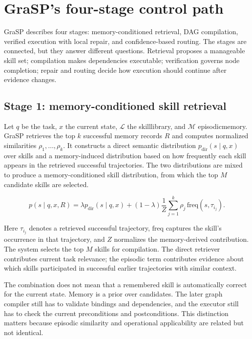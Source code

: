 \section{GraSP's four-stage control path}
\label{sec:ch17-four-stage}

GraSP describes four stages: memory-conditioned retrieval, DAG compilation, verified execution with local repair, and confidence-based routing. The stages are connected, but they answer different questions. Retrieval proposes a manageable skill set; compilation makes dependencies executable; verification governs node completion; repair and routing decide how execution should continue after evidence changes.\autocite{xia2026grasp}

\subsection{Stage 1: memory-conditioned skill retrieval}

Let \(q\) be the task, \(x\) the current state, \(\mathcal{L}\) the \gls{skilllibrary}, and \(\mathcal{M}\) \gls{episodicmemory}. GraSP retrieves the top \(k\) successful memory records \(R\) and computes normalized similarities \(\rho_1,\ldots,\rho_k\). It constructs a direct semantic distribution \(p_{\mathrm{dir}}(s\mid q,x)\) over skills and a memory-induced distribution based on how frequently each skill appears in the retrieved successful trajectories. The two distributions are mixed to produce a memory-conditioned skill distribution, from which the top \(M\) candidate skills are selected.

\[
 p(s\mid q,x,R)=\lambda p_{\mathrm{dir}}(s\mid q,x)
 +(1-\lambda)\frac{1}{Z}\sum_{j=1}^{k}\rho_j\,\mathrm{freq}(s,\tau_{i_j}).
\]

Here \(\tau_{i_j}\) denotes a retrieved successful trajectory, \(\mathrm{freq}\) captures the skill's occurrence in that trajectory, and \(Z\) normalizes the memory-derived contribution. The system selects the top \(M\) skills for compilation. The direct retriever contributes current task relevance; the episodic term contributes evidence about which skills participated in successful earlier trajectories with similar context.\autocite{xia2026grasp}

The combination does not mean that a remembered skill is automatically correct for the current state. Memory is a prior over candidates. The later graph compiler still has to validate bindings and dependencies, and the executor still has to check the current preconditions and postconditions. This distinction matters because episodic similarity and operational applicability are related but not identical.

